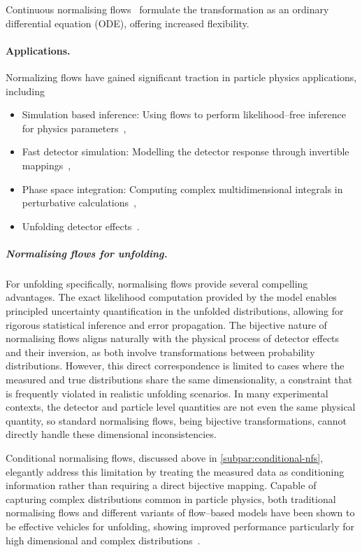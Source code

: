                 Continuous normalising flows~\cite{mathieu_riemannian_2020} formulate the transformation as an ordinary differential equation (ODE), offering increased flexibility.
        \paragraph{Applications.}
            Normalizing flows have gained significant traction in particle physics applications, including
            \begin{itemize}
                \item Simulation based inference: Using flows to perform likelihood--free inference for physics parameters~\cite{Green2020Gravitational-waveFlows},
                \item Fast detector simulation: Modelling the detector response through invertible mappings~\cite{krause_fast_2023},
                \item Phase space integration: Computing complex multidimensional integrals in perturbative calculations~\cite{Winterhalder2022TargetingNetworks},
                \item Unfolding detector effects~\cite{zeng_solving_2024}.
            \end{itemize}
            \subparagraph{Normalising flows for unfolding.}
                For unfolding specifically, normalising flows provide several compelling advantages.
                The exact likelihood computation provided by the model enables principled uncertainty quantification in the unfolded distributions, allowing for rigorous statistical inference and error propagation.
                The bijective nature of normalising flows aligns naturally with the physical process of detector effects and their inversion, as both involve transformations between probability distributions.
                However, this direct correspondence is limited to cases where the measured and true distributions share the same dimensionality, a constraint that is frequently violated in realistic unfolding scenarios.
                In many experimental contexts, the detector and particle level quantities are not even the same physical quantity, so standard normalising flows, being bijective transformations, cannot directly handle these dimensional inconsistencies.
                
                Conditional normalising flows, discussed above in \cref{subpar:conditional-nfs}, elegantly address this limitation by treating the measured data as conditioning information rather than requiring a direct bijective mapping.
                Capable of capturing complex distributions common in particle physics, both traditional normalising flows and different variants of flow--based models have been shown to be effective vehicles for unfolding, showing improved performance particularly for high dimensional and complex distributions~\cite{bellagente_go_2022}.

